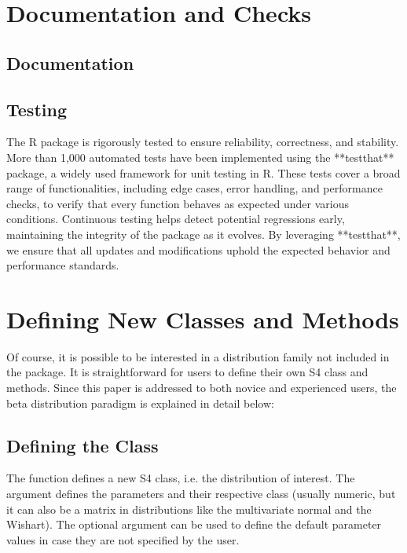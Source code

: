 \documentclass[nojss]{jss}
\newcommand{\fct}[1]{\code{#1()}}
\begin{document}
\section[Documentation and Checks]{Documentation and Checks} \label{s:doc}

\subsection[Documentation]{Documentation}

\subsection[Testing]{Testing}

The R package is rigorously tested to ensure reliability, correctness, and stability. More than 1,000 automated tests have been implemented using the **testthat** package, a widely used framework for unit testing in R. These tests cover a broad range of functionalities, including edge cases, error handling, and performance checks, to verify that every function behaves as expected under various conditions. Continuous testing helps detect potential regressions early, maintaining the integrity of the package as it evolves. By leveraging **testthat**, we ensure that all updates and modifications uphold the expected behavior and performance standards.

\section[Defining New Classes and Methods]{Defining New Classes and Methods} \label{s:new}

Of course, it is possible to be interested in a distribution family not included in the package. It is straightforward for users to define their own S4 class and methods. Since this paper is addressed to both novice and experienced  users, the beta distribution paradigm is explained in detail below:

\subsection[Defining the Class]{Defining the Class}

The \fct{setClass} function defines a new S4 class, i.e. the distribution of interest. The  argument defines the parameters and their respective class (usually numeric, but it can also be a matrix in distributions like the multivariate normal and the Wishart). The optional argument  can be used to define the default parameter values in case they are not specified by the user.
\end{document}
